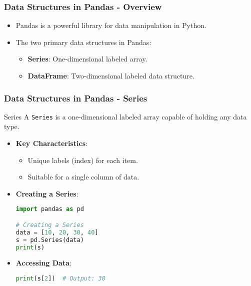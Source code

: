 \documentclass[aspectratio=169]{beamer}
\begin{document}
\begin{frame}[fragile]
    \frametitle{Data Structures in Pandas - Overview}
    \begin{itemize}
        \item Pandas is a powerful library for data manipulation in Python.
        \item The two primary data structures in Pandas:
        \begin{itemize}
            \item \textbf{Series}: One-dimensional labeled array.
            \item \textbf{DataFrame}: Two-dimensional labeled data structure.
        \end{itemize}
    \end{itemize}
\end{frame}

\begin{frame}[fragile]
    \frametitle{Data Structures in Pandas - Series}
    \begin{block}{Series}
        A \texttt{Series} is a one-dimensional labeled array capable of holding any data type.
    \end{block}
    \begin{itemize}
        \item \textbf{Key Characteristics}:
        \begin{itemize}
            \item Unique labels (index) for each item.
            \item Suitable for a single column of data.
        \end{itemize}
        \item \textbf{Creating a Series}:
        \begin{lstlisting}[language=Python]
import pandas as pd

# Creating a Series
data = [10, 20, 30, 40]
s = pd.Series(data)
print(s)
        \end{lstlisting}
        \item \textbf{Accessing Data}:
        \begin{lstlisting}[language=Python]
print(s[2])  # Output: 30
        \end{lstlisting}
    \end{itemize}
\end{frame}
\end{document}
